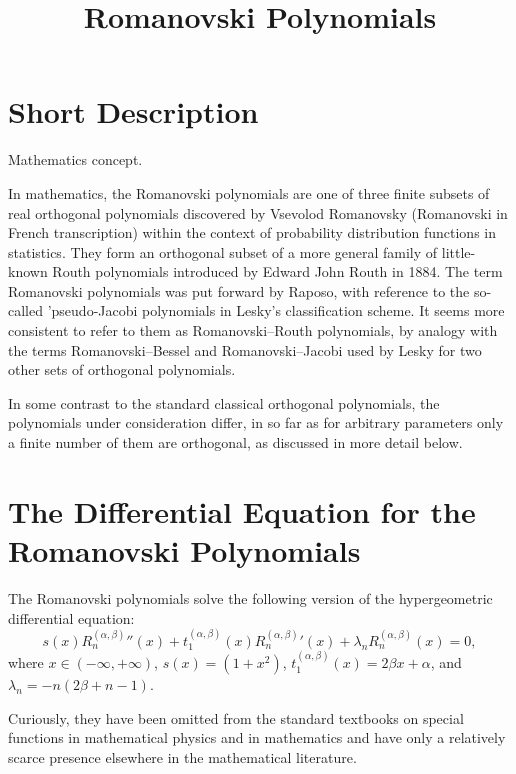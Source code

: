 \documentclass{article}
\begin{document}
\title{Romanovski Polynomials}

\date{}

\maketitle

\section*{Short Description}

Mathematics concept.

In mathematics, the Romanovski polynomials are one of three finite subsets of
real orthogonal polynomials discovered by Vsevolod
Romanovsky{\cite{Romanovski1929}} (Romanovski in French transcription) within
the context of probability distribution functions in statistics. They form an
orthogonal subset of a more general family of little-known Routh polynomials
introduced by Edward John Routh{\cite{Routh1884}} in 1884. The term Romanovski
polynomials was put forward by Raposo,{\cite{Raposo2007}} with reference to
the so-called 'pseudo-Jacobi polynomials in Lesky's classification
scheme.{\cite{Lesky1996}} It seems more consistent to refer to them as
Romanovski--Routh polynomials, by analogy with the terms Romanovski--Bessel
and Romanovski--Jacobi used by Lesky for two other sets of orthogonal
polynomials.

In some contrast to the standard classical orthogonal polynomials, the
polynomials under consideration differ, in so far as for arbitrary parameters
only a finite number of them are orthogonal, as discussed in more detail
below.

\section*{The Differential Equation for the Romanovski Polynomials}

The Romanovski polynomials solve the following version of the hypergeometric
differential equation:
\begin{equation}
  s (x) {R^{(\alpha, \beta)}_n}'' (x) + t^{(\alpha, \beta)}_1 (x) {R^{(\alpha,
  \beta)}_n}' (x) + \lambda_n R^{(\alpha, \beta)}_n (x) = 0,
\end{equation}
where $x \in (- \infty, + \infty)$, $s (x) = (1 + x^2)$, $t^{(\alpha,
\beta)}_1 (x) = 2 \beta x + \alpha$, and $\lambda_n = - n (2 \beta + n - 1)$.

Curiously, they have been omitted from the standard textbooks on special
functions in mathematical physics and in
mathematics{\cite{Abramowitz1972,Nikiforov1988,Szego1939,Ismail2005}} and have
only a relatively scarce presence elsewhere in the mathematical
literature.{\cite{Askey1987,Zarzo1995}}
\end{document}
